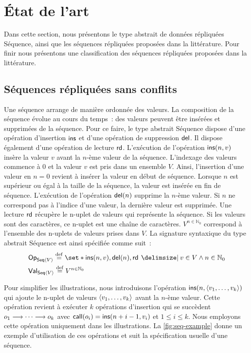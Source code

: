\section{État de l'art}\label{sec:state-art-seq}

Dans cette section, nous présentons le type abstrait de données répliquées Séquence, ainsi que les séquences répliquées proposées dans la littérature.
Pour finir nous présentons une classification des séquences répliquées proposées dans la littérature.

\subsection{Séquences répliquées sans conflits}\label{subsec:replseq}

Une séquence arrange de manière ordonnée des valeurs.
La composition de la séquence évolue au cours du temps~:
des valeurs peuvent être insérées et supprimées de la séquence.
Pour ce faire, le type abstrait Séquence dispose d'une opération d'insertion $\trm{ins}$ et d'une opération de suppression $\trm{del}$.
Il dispose également d'une opération de lecture $\trm{rd}$.
L'exécution de l'opération $\trm{ins}(n, v)$ insère la valeur $v$ avant la $n$-ème valeur de la séquence.
L'indexage des valeurs commence à $0$ et la valeur $v$ est pris dans un ensemble $V$.
Ainsi, l'insertion d'une valeur en $n = 0$ revient à insérer la valeur en début de séquence.
Lorsque $n$ est supérieur ou égal à la taille de la séquence, la valeur est insérée en fin de séquence.
L'exécution de l'opération $\trm{del}(n)$ supprime la $n$-ème valeur.
Si $n$ ne correspond pas à l'indice d'une valeur, la dernière valeur est supprimée.
Une lecture $\trm{rd}$ récupère le n-uplet de valeurs qui représente la séquence.
Si les valeurs sont des caractères, ce n-uplet est une chaîne de caractères.
$V^{n \in \mathbb{N}_0}$ correspond à l'ensemble des n-uplets de valeurs prises dans $V$.
La signature syntaxique du type abstrait Séquence est ainsi spécifiée comme suit~:
%
\begin{align*}
&\trm{Op}_{\trm{Seq}\tuple*{V}} \defeq \set*{\trm{ins}(n, v), \trm{del}(n), \trm{rd} \given v \in V \land n \in \mathbb{N}_0}\\
&\trm{Val}_{\trm{Seq}\tuple*{V}} \defeq V^{n \in \mathbb{N}_0}
\end{align*}

Pour simplifier les illustrations, nous introduisons l'opération $\trm{ins}(n, \tuple*{v_1,\dotsc,v_k})$ qui ajoute le n-uplet de valeurs $\tuple*{v_1,\dotsc,v_k}$ avant la $n$-ème valeur.
Cette opération revient à exécuter $k$ opérations d'insertion qui se succèdent $o_1 \pre \dotsb \pre o_k$ avec $\trm{call}(o_i) = \trm{ins}(n+i-1, v_i)$ et $1 \leq i \leq k$.
Nous employons cette opération uniquement dans les illustrations.
La \autoref{fig:seq-example} donne un exemple d'utilisation de ces opérations et suit la spécification usuelle d'une séquence.

